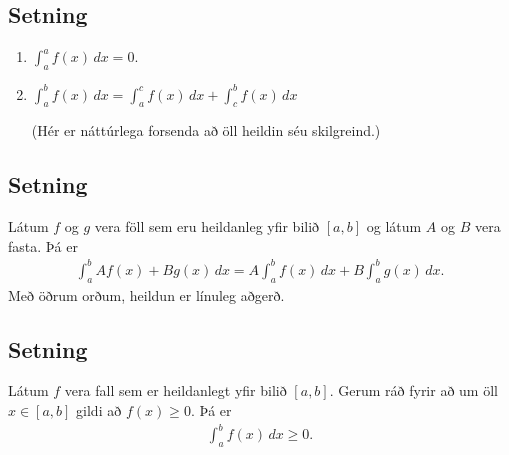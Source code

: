 \documentclass[a4paper,10pt,icelandic]{sphinxmanual}
\begin{document}
\subsection{Setning}
\label{\detokenize{kafli06:id3}}\begin{enumerate}
\item {} 
\(\int_a^a f(x)\,dx=0\).

\item {} 
\(\int_a^b f(x)\,dx=\int_a^c f(x)\,dx+\int_c^b f(x)\,dx\)

(Hér er náttúrlega forsenda að öll heildin séu skilgreind.)

\end{enumerate}


\subsection{Setning}
\label{\detokenize{kafli06:id4}}
Látum \(f\) og \(g\) vera föll sem eru heildanleg yfir bilið
\([a,b]\) og látum \(A\) og \(B\) vera fasta. Þá er
\begin{equation*}
\begin{split}\int_a^b Af(x)+Bg(x)\,dx=A\int_a^b f(x)\,dx+B\int_a^b g(x)\,dx.\end{split}
\end{equation*}
Með öðrum orðum, heildun er línuleg aðgerð.


\subsection{Setning}
\label{\detokenize{kafli06:id5}}
Látum \(f\) vera fall sem er heildanlegt yfir bilið \([a, b]\).
Gerum ráð fyrir að um öll \(x\in [a, b]\) gildi að
\(f(x)\geq 0\). Þá er
\begin{equation*}
\begin{split}\int_a^b f(x)\,dx\geq 0.\end{split}
\end{equation*}
\end{document}
